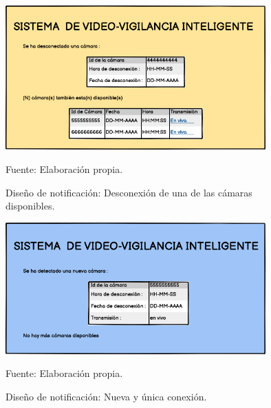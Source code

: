\begin{figure}[H]
    \begin{center}
        \includegraphics[width=10cm]{img/capitulo_4/cam_disconnected_more_cams.png}
    \end{center}
    \begin{center}
        \caption{Diseño de notificación: Desconexión de una de las cámaras disponibles.}
        Fuente: Elaboración propia.
        \label{fig:desing_cam_disconn_more_cams}
    \end{center}
\end{figure}

\begin{figure}[H]
    \begin{center}
        \includegraphics[width=10cm]{img/capitulo_4/cam_disconnected_no_more_cams.png}
    \end{center}
    \begin{center}
        \caption{Diseño de notificación: Nueva y única conexión.}
        Fuente: Elaboración propia.
        \label{fig:desing_cam_disconn_no_more_cams}
    \end{center}
\end{figure}

